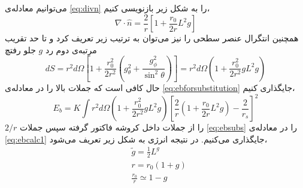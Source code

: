 می‌توانیم معادله‌ی
\ref{eq:divn}
را به شکل زیر بازنویسی کنیم،
\begin{equation}
\nabla\cdot\hat n =\frac{2}{r}\left[1+\frac{r_0}{2r}L^2g\right]
\label{eq:divnL2}
\end{equation}
همچنین انتگرال عنصر سطحی را نیز می‌توان به ترتیب زیر تعریف کرد و تا حد تقریب مرتبه‌ی دوم رد $g$ جلو رفتچ
\begin{equation}
dS=r^2d\Omega\left[1+\frac{r_0^2}{2r^2}\left(g_\theta^2+\frac{g_\phi^2}{\sin^2\theta}\right)\right]=r^2d\Omega\left(1+\frac{r_0^2}{2r^2}gL^2g\right)
\label{eq:dsL2}
\end{equation}
حال کافی است که جملات بالا را در معادله‌ی \ref{eq:ebforsubstitution} جایگذاری کنیم،
\begin{equation}
E_b=K\int r^2d\Omega\left(1+\frac{r_0^2}{2r^2}gL^2g\right)\left[\frac{2}{r}\left(1+\frac{r_0}{2r}L^2g\right)-\frac{2}{r_s}\right]^2
\label{eq:ebcalc1}
\end{equation}
 $2/r$ را از جملات داخل کروشه فاکتور گرفته سپس جملات 
 \ref{eq:ebsubs}
 را در معادله‌ی
 \ref{eq:ebcalc1}
 جایگذاری می‌کنیم‌. در نتیجه انرژی به شکل زیر تعریف می‌شود،
\begin{equation}
\begin{aligned}
&\tilde{g}=\frac{1}{2}L^g\\
&r=r_0(1+g)\\
&\frac{r_0}{r}\simeq 1-g
\label{eq:ebsubs}
\end{aligned}
\end{equation}


